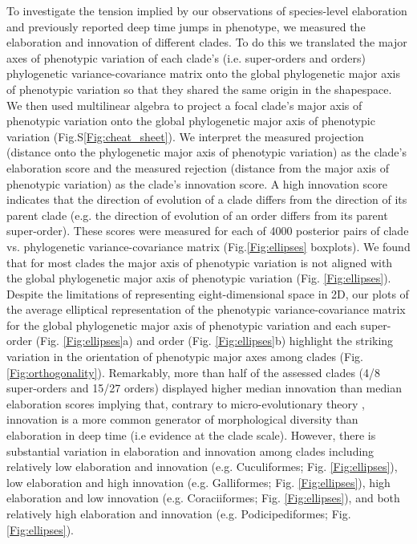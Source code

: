\documentclass[12pt,letterpaper]{article}
\begin{document}
To investigate the tension implied by our observations of species-level elaboration and previously reported deep time jumps in phenotype, we measured the elaboration and innovation of different clades.
To do this we translated the major axes of phenotypic variation of each clade's (i.e. super-orders and orders) phylogenetic variance-covariance matrix onto the global phylogenetic major axis of phenotypic variation so that they shared the same origin in the shapespace.
We then used multilinear algebra to project a focal clade's major axis of phenotypic variation onto the global phylogenetic major axis of phenotypic variation (Fig.S\ref{Fig:cheat_sheet}).
We interpret the measured projection (distance onto the phylogenetic major axis of phenotypic variation) as the clade's elaboration score and the measured rejection (distance from the major axis of phenotypic variation) as the clade's innovation score.
A high innovation score indicates that the direction of evolution of a clade differs from the direction of its parent clade (e.g. the direction of evolution of an order differs from its parent super-order).
These scores were measured for each of 4000 posterior pairs of clade vs. phylogenetic variance-covariance matrix (Fig.\ref{Fig:ellipses} boxplots).
We found that for most clades the major axis of phenotypic variation is not aligned with the global phylogenetic major axis of phenotypic variation (Fig. \ref{Fig:ellipses}). 
Despite the limitations of representing eight-dimensional space in 2D, our plots of the average elliptical representation of the phenotypic variance-covariance matrix for the global phylogenetic major axis of phenotypic variation and each super-order (Fig. \ref{Fig:ellipses}a) and order (Fig. \ref{Fig:ellipses}b) highlight the striking variation in the orientation of phenotypic major axes among clades (Fig. \ref{Fig:orthogonality}).
Remarkably, more than half of the assessed clades (4/8 super-orders and 15/27 orders) displayed higher median innovation than median elaboration scores implying that, contrary to micro-evolutionary theory \cite{schluter1996adaptive,marroig2005size}, innovation is a more common generator of morphological diversity than elaboration in deep time (i.e evidence at the clade scale).
However, there is substantial variation in elaboration and innovation among clades including relatively low elaboration and innovation (e.g. Cuculiformes; Fig. \ref{Fig:ellipses}), low elaboration and high innovation (e.g. Galliformes; Fig. \ref{Fig:ellipses}), high elaboration and low innovation (e.g. Coraciiformes; Fig. \ref{Fig:ellipses}), and both relatively high elaboration and innovation (e.g. Podicipediformes; Fig. \ref{Fig:ellipses}).
\end{document}
